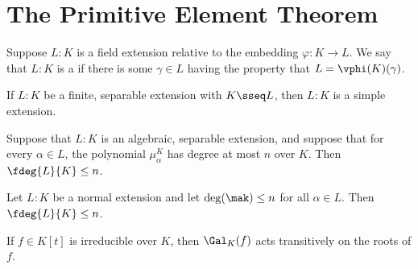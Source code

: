 \documentclass[a4paper]{article}
\begin{document}
\section{The Primitive Element Theorem}
\begin{tdefinition}
  Suppose \( L:K \) is a field extension relative to the embedding \( \varphi:K\to L \).
  We say that \( L:K \) is a  if there is some \( \gamma\in L \) having the property that \( L=\vphi(K)(\gamma) \).
\end{tdefinition}

\begin{ttheorem}
  If \( L:K \) be a finite, separable extension with \( K\sseq L \), then \( L:K \) is a simple extension.
\end{ttheorem}

\begin{tcorollary}
  Suppose that \( L:K \) is an algebraic, separable extension, and suppose that for every \( \alpha\in L \), the polynomial \( \mu_\alpha^K \) has degree at most \( n \) over \( K \).
  Then \( \fdeg{L}{K}\leq n \).
\end{tcorollary}

\quad Let \( L:K \) be a normal extension and let \( \deg(\mak)\leq n \) for all \( \alpha\in L \).
Then \( \fdeg{L}{K}\leq n \).

\begin{tcorollary}
  If \( f\in K[t] \) is irreducible over \( K \), then \( \Gal_K(f) \) acts transitively on the roots of \( f \).
\end{tcorollary}
\end{document}
